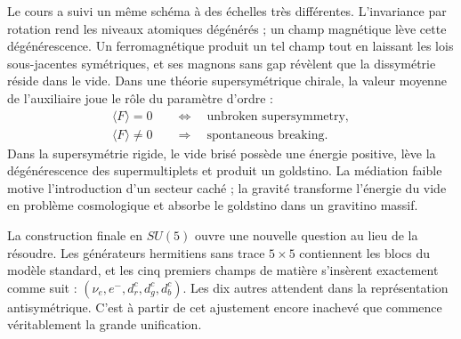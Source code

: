 Le cours a suivi un même schéma à des échelles très différentes. L’invariance par rotation rend les niveaux atomiques dégénérés ; un champ magnétique lève cette dégénérescence. Un ferromagnétique produit un tel champ tout en laissant les lois sous-jacentes symétriques, et ses magnons sans gap révèlent que la dissymétrie réside dans le vide. Dans une théorie supersymétrique chirale, la valeur moyenne de l’auxiliaire joue le rôle du paramètre d’ordre :
\begin{equation}
\begin{aligned}
\langle F\rangle=0
&\quad\Longleftrightarrow\quad
\text{unbroken supersymmetry},\\
\langle F\rangle\neq0
&\quad\Longrightarrow\quad
\text{spontaneous breaking}.
\end{aligned}
\end{equation}
Dans la supersymétrie rigide, le vide brisé possède une énergie positive, lève la dégénérescence des supermultiplets et produit un goldstino. La médiation faible motive l’introduction d’un secteur caché ; la gravité transforme l’énergie du vide en problème cosmologique et absorbe le goldstino dans un gravitino massif.

La construction finale en \(SU(5)\) ouvre une nouvelle question au lieu de la résoudre. Les générateurs hermitiens sans trace \(5\times5\) contiennent les blocs du modèle standard, et les cinq premiers champs de matière s’insèrent exactement comme suit :
\((\nu_e,e^-,d^c_r,d^c_g,d^c_b)\). Les dix autres attendent dans la représentation antisymétrique. C’est à partir de cet ajustement encore inachevé que commence véritablement la grande unification.
